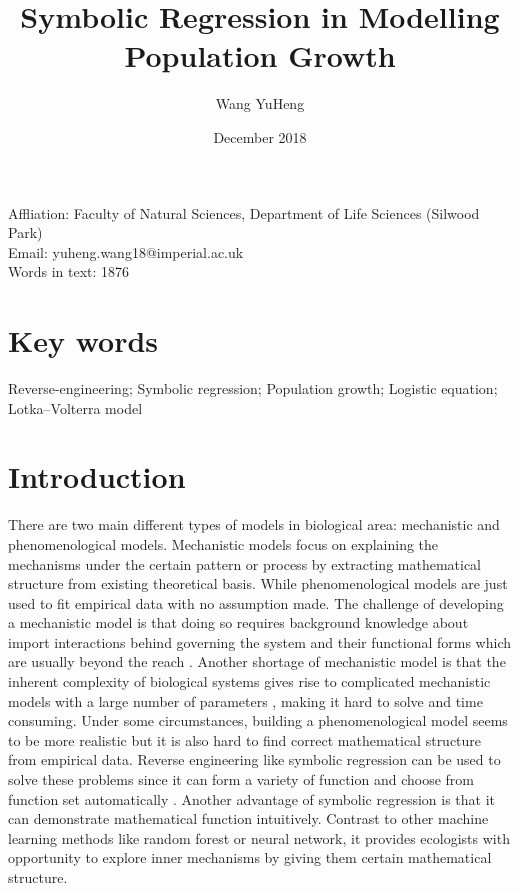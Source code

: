 \documentclass[11pt,a4paper]{article}
\title{\myfont Symbolic Regression in Modelling Population Growth}
\author{Wang YuHeng }
\date{December 2018}
\begin{document}
\maketitle
\begin{center}
\vspace{8.8cm}
Affliation: Faculty of Natural Sciences, Department of Life Sciences (Silwood Park)
\\
Email: yuheng.wang18@imperial.ac.uk
\\
Words in text: 1876
\end{center}
\newpage

\section{Key words}
Reverse-engineering; Symbolic regression; Population growth; Logistic equation; Lotka–Volterra model 



\section{Introduction}
There are two main different types of models in biological area: mechanistic and phenomenological models. Mechanistic models focus on explaining the mechanisms under the certain pattern or process by extracting mathematical structure from existing theoretical basis. While phenomenological models are just used to fit empirical data with no assumption made. The challenge of developing a mechanistic model is that doing so requires background knowledge about import interactions behind governing the system and their functional forms which are usually beyond the reach \citep{BenjaminT.MartinStephanB.Munch2018}. Another shortage of mechanistic model is that the inherent complexity of biological systems gives rise to complicated mechanistic models with a large number of parameters \citep{Transtrum2016}, making it hard to solve and time consuming. Under some circumstances, building a phenomenological model seems to be more realistic but it is also hard to find correct mathematical structure from empirical data. Reverse engineering like symbolic regression can be used to solve these problems since it can form a variety of function and choose from function set automatically \citep{BenjaminT.MartinStephanB.Munch2018}. Another advantage of symbolic regression is that it can demonstrate mathematical function intuitively. Contrast to other machine learning methods like random forest or neural network, it provides ecologists with opportunity to explore inner mechanisms by giving them certain mathematical structure.
\end{document}
